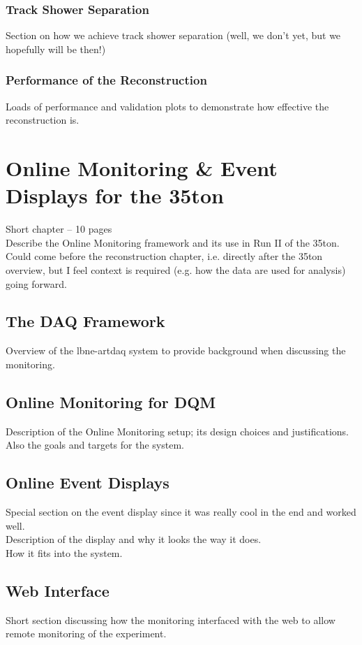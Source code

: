\documentclass[a4paper,12pt]{report}
\begin{document}
\subsubsection{Track Shower Separation}
Section on how we achieve track shower separation (well, we don't yet, but we hopefully will be then!)
\subsubsection{Performance of the Reconstruction}
Loads of performance and validation plots to demonstrate how effective the reconstruction is.

\section{Online Monitoring \& Event Displays for the 35ton}
Short chapter -- 10 pages\\
Describe the Online Monitoring framework and its use in Run II of the 35ton.\\
Could come before the reconstruction chapter, i.e. directly after the 35ton overview, but I feel context is required (e.g. how the data are used for analysis) going forward.
\subsection{The DAQ Framework}
Overview of the lbne-artdaq system to provide background when discussing the monitoring.
\subsection{Online Monitoring for DQM}
Description of the Online Monitoring setup; its design choices and justifications.\\
Also the goals and targets for the system.
\subsection{Online Event Displays}
Special section on the event display since it was really cool in the end and worked well.\\
Description of the display and why it looks the way it does.\\
How it fits into the system.
\subsection{Web Interface}
Short section discussing how the monitoring interfaced with the web to allow remote monitoring of the experiment.
\end{document}
